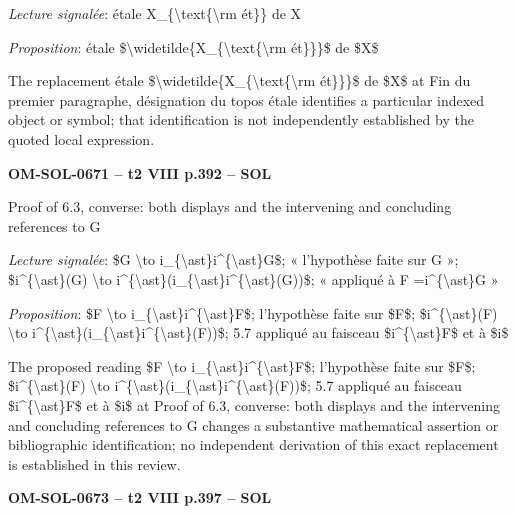 \emph{Lecture signalée}: étale X\_\{\textbackslash{}text\{\textbackslash{}rm ét\}\} de X\par
\emph{Proposition}: étale \$\textbackslash{}widetilde\{X\_\{\textbackslash{}text\{\textbackslash{}rm ét\}\}\}\$ de \$X\$\par
The replacement étale \$\textbackslash{}widetilde\{X\_\{\textbackslash{}text\{\textbackslash{}rm ét\}\}\}\$ de \$X\$ at Fin du premier paragraphe, désignation du topos étale identifies a particular indexed object or symbol; that identification is not independently established by the quoted local expression.\par
\par\noindent\textbf{OM-SOL-0671 -- t2 VIII p.392 -- SOL}\par
Proof of 6.3, converse: both displays and the intervening and concluding references to G\par
\emph{Lecture signalée}: \$G \textbackslash{}to i\_\{\textbackslash{}ast\}i\textasciicircum{}\{\textbackslash{}ast\}G\$; « l'hypothèse faite sur G »; \$i\textasciicircum{}\{\textbackslash{}ast\}(G) \textbackslash{}to i\textasciicircum{}\{\textbackslash{}ast\}(i\_\{\textbackslash{}ast\}i\textasciicircum{}\{\textbackslash{}ast\}(G))\$; « appliqué à F =\allowbreak  i\textasciicircum{}\{\textbackslash{}ast\}G »\par
\emph{Proposition}: \$F \textbackslash{}to i\_\{\textbackslash{}ast\}i\textasciicircum{}\{\textbackslash{}ast\}F\$; l'hypothèse faite sur \$F\$; \$i\textasciicircum{}\{\textbackslash{}ast\}(F) \textbackslash{}to i\textasciicircum{}\{\textbackslash{}ast\}(i\_\{\textbackslash{}ast\}i\textasciicircum{}\{\textbackslash{}ast\}(F))\$; 5.7 appliqué au faisceau \$i\textasciicircum{}\{\textbackslash{}ast\}F\$ et à \$i\$\par
The proposed reading \$F \textbackslash{}to i\_\{\textbackslash{}ast\}i\textasciicircum{}\{\textbackslash{}ast\}F\$; l'hypothèse faite sur \$F\$; \$i\textasciicircum{}\{\textbackslash{}ast\}(F) \textbackslash{}to i\textasciicircum{}\{\textbackslash{}ast\}(i\_\{\textbackslash{}ast\}i\textasciicircum{}\{\textbackslash{}ast\}(F))\$; 5.7 appliqué au faisceau \$i\textasciicircum{}\{\textbackslash{}ast\}F\$ et à \$i\$ at Proof of 6.3, converse: both displays and the intervening and concluding references to G changes a substantive mathematical assertion or bibliographic identification; no independent derivation of this exact replacement is established in this review.\par
\par\noindent\textbf{OM-SOL-0673 -- t2 VIII p.397 -- SOL}\par
